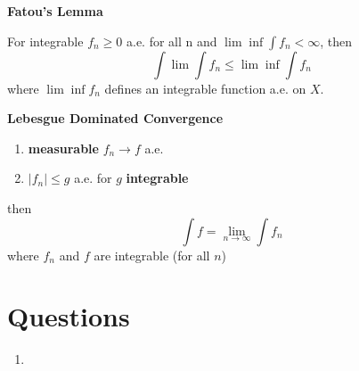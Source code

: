 \documentclass[a4paper, 12pt]{article}
\newcommand{\bt}[1]{\textbf{#1}} %
\newcommand{\gray}[1]{{\leavevmode\color[gray]{0.5}{#1}}} %
\begin{document}
\begin{multicols}{2}
\centerline{\bt{Fatou's Lemma}}
For integrable $f_n \geq 0$ a.e. for all n and 
$\lim \inf \int f_n < \infty$, then 
$$\int \lim \int f_n \leq \lim \inf \int f_n$$
where $\lim \inf f_n$ defines an integrable function a.e. on $X$. \\
\gray{``$\lim \inf$ of integrable is integrable and less than integral of parts"}

\centerline{\bt{Lebesgue Dominated Convergence}}
\begin{enumerate}
    \item \bt{measurable} $f_n \rightarrow f$ a.e.
    \item $|f_n| \leq g$ a.e. for $g$ \bt{integrable}
\end{enumerate}
then 
$$\int f = \lim_{n \rightarrow \infty} \int f_n$$
where $f_n$ and $f$ are integrable (for all $n$)\\
\gray{``interchange $\lim$ and $\int$ for measurable functions bounded by an integrable function"}






\section{Questions}
\begin{enumerate}
    \item
\end{enumerate}


\end{multicols}
\end{document}

